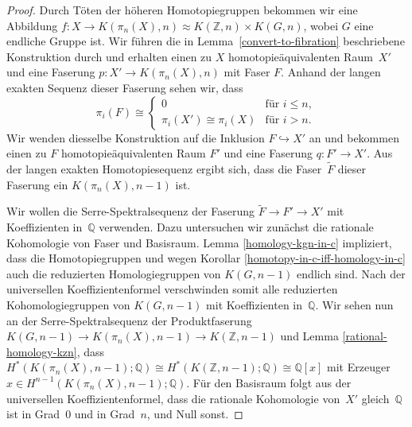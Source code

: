 \documentclass[11pt, a4paper, german]{article}
\theoremstyle{definition}
\theoremstyle{remark}
\newcommand{\Z}{\mathbb{Z}} %
\newcommand{\Q}{\mathbb{Q}} %
\begin{document}
\begin{proof}
  Durch Töten der höheren Homotopiegruppen bekommen wir eine Abbildung $f : X \to K(\pi_n(X), n) \approx K(\Z, n) \times K(G, n)$, wobei $G$ eine endliche Gruppe ist.
  Wir führen die in Lemma~\ref{convert-to-fibration} beschriebene Konstruktion durch und erhalten einen zu $X$ homotopieäquivalenten Raum~$X'$ und eine Faserung $p : X' \to K(\pi_n(X), n)$ mit Faser $F$.
  Anhand der langen exakten Sequenz dieser Faserung sehen wir, dass
  \[
    \pi_i(F) \cong \begin{cases}
      0 & \text{für $i \leq n$}, \\
      \pi_i(X') \cong \pi_i(X) & \text{für $i > n$.}
    \end{cases}
  \]
  Wir wenden diesselbe Konstruktion auf die Inklusion $F \hookrightarrow X'$ an und bekommen einen zu $F$ homotopieäquivalenten Raum $F'$ und eine Faserung $q : F' \to X'$.
  Aus der langen exakten Homotopiesequenz ergibt sich, dass die Faser~$\tilde{F}$ dieser Faserung ein $K(\pi_n(X), n{-}1)$ ist.

  Wir wollen die Serre-Spektralsequenz der Faserung $\tilde{F} \to F' \to X'$ mit Koeffizienten in~$\Q$ verwenden.
  Dazu untersuchen wir zunächst die rationale Kohomologie von Faser und Basisraum.
  Lemma \ref{homology-kgn-in-c} impliziert, dass die Homotopiegruppen und wegen Korollar \ref{homotopy-in-c-iff-homology-in-c} auch die reduzierten Homologiegruppen von $K(G, n{-}1)$ endlich sind.
  Nach der universellen Koeffizientenformel verschwinden somit alle reduzierten Kohomologiegruppen von $K(G, n{-}1)$ mit Koeffizienten in~$\Q$.
  Wir sehen nun an der Serre-Spektralsequenz der Produktfaserung $K(G, n{-}1) \to K(\pi_n(X), n{-}1) \to K(\Z, n{-}1)$ und Lemma \ref{rational-homology-kzn}, dass $H^*(K(\pi_n(X), n{-}1); \Q) \cong H^*(K(\Z, n{-}1); \Q) \cong \Q[x]$ mit Erzeuger $x \in H^{n-1}(K(\pi_n(X), n{-}1); \Q)$.
  Für den Basisraum folgt aus der universellen Koeffizientenformel, dass die rationale Kohomologie von~$X'$ gleich~$\Q$ ist in Grad~$0$ und in Grad~$n$, und Null sonst.


\end{proof}
\end{document}
